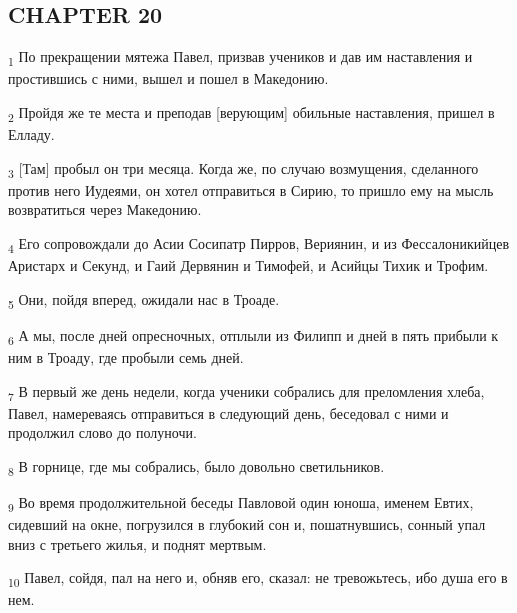 \subsection{CHAPTER 20}
\begin{tcolorbox}
\textsubscript{1} По прекращении мятежа Павел, призвав учеников и дав им наставления и простившись с ними, вышел и пошел в Македонию.
\end{tcolorbox}
\begin{tcolorbox}
\textsubscript{2} Пройдя же те места и преподав [верующим] обильные наставления, пришел в Елладу.
\end{tcolorbox}
\begin{tcolorbox}
\textsubscript{3} [Там] пробыл он три месяца. Когда же, по случаю возмущения, сделанного против него Иудеями, он хотел отправиться в Сирию, то пришло ему на мысль возвратиться через Македонию.
\end{tcolorbox}
\begin{tcolorbox}
\textsubscript{4} Его сопровождали до Асии Сосипатр Пирров, Вериянин, и из Фессалоникийцев Аристарх и Секунд, и Гаий Дервянин и Тимофей, и Асийцы Тихик и Трофим.
\end{tcolorbox}
\begin{tcolorbox}
\textsubscript{5} Они, пойдя вперед, ожидали нас в Троаде.
\end{tcolorbox}
\begin{tcolorbox}
\textsubscript{6} А мы, после дней опресночных, отплыли из Филипп и дней в пять прибыли к ним в Троаду, где пробыли семь дней.
\end{tcolorbox}
\begin{tcolorbox}
\textsubscript{7} В первый же день недели, когда ученики собрались для преломления хлеба, Павел, намереваясь отправиться в следующий день, беседовал с ними и продолжил слово до полуночи.
\end{tcolorbox}
\begin{tcolorbox}
\textsubscript{8} В горнице, где мы собрались, было довольно светильников.
\end{tcolorbox}
\begin{tcolorbox}
\textsubscript{9} Во время продолжительной беседы Павловой один юноша, именем Евтих, сидевший на окне, погрузился в глубокий сон и, пошатнувшись, сонный упал вниз с третьего жилья, и поднят мертвым.
\end{tcolorbox}
\begin{tcolorbox}
\textsubscript{10} Павел, сойдя, пал на него и, обняв его, сказал: не тревожьтесь, ибо душа его в нем.
\end{tcolorbox}
